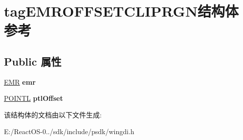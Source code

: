 \hypertarget{structtag_e_m_r_o_f_f_s_e_t_c_l_i_p_r_g_n}{}\section{tag\+E\+M\+R\+O\+F\+F\+S\+E\+T\+C\+L\+I\+P\+R\+G\+N结构体 参考}
\label{structtag_e_m_r_o_f_f_s_e_t_c_l_i_p_r_g_n}
\subsection*{Public 属性}
\begin{DoxyCompactItemize}
\item 
\mbox{\label{structtag_e_m_r_o_f_f_s_e_t_c_l_i_p_r_g_n_a1de83c03f3fd162bbfb8eeec41aa4b3c}} 
\hyperlink{structtag_e_m_r}{E\+MR} {\bfseries emr}
\item 
\mbox{\label{structtag_e_m_r_o_f_f_s_e_t_c_l_i_p_r_g_n_a9214b325f130b815279a9600b2d7a78f}} 
\hyperlink{struct___p_o_i_n_t_l}{P\+O\+I\+N\+TL} {\bfseries ptl\+Offset}
\end{DoxyCompactItemize}


该结构体的文档由以下文件生成\+:\begin{DoxyCompactItemize}
\item 
E\+:/\+React\+O\+S-\/0../sdk/include/psdk/wingdi.\+h\end{DoxyCompactItemize}
